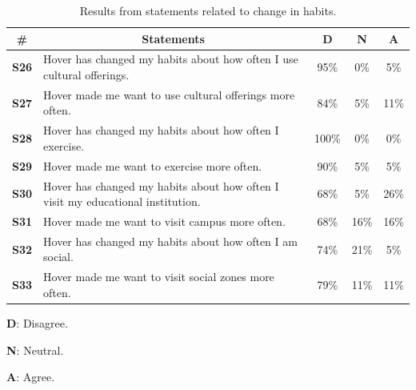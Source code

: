 \begin{table}[H]
    \begin{threeparttable}[t]
    \small
    \begin{tabularx}{\textwidth}{|c|X|c|c|c|}
        \hline
        \multicolumn{1}{|c|}{\textbf{\#}} &
        \multicolumn{1}{c|}{\textbf{Statements}}  & 
        \multicolumn{1}{c|}{\textbf{D}} & 
        \multicolumn{1}{c|}{\textbf{N}}  & 
        \multicolumn{1}{c|}{\textbf{A}} \\ \hline
        \textbf{S26} & Hover has changed my habits about how often I use cultural offerings. & 95\% & 0\% & 5\%  \\
        \textbf{S27} & Hover made me want to use cultural offerings more often. & 84\% & 5\% & 11\%  \\
        \textbf{S28} & Hover has changed my habits about how often I exercise. & 100\% & 0\% & 0\%  \\
        \textbf{S29} & Hover made me want to exercise more often. & 90\% & 5\% & 5\%  \\
        \textbf{S30} & Hover has changed my habits about how often I visit my educational institution. & 68\% & 5\% & 26\%  \\
        \textbf{S31} & Hover made me want to visit campus more often. & 68\% & 16\% & 16\%  \\
        \textbf{S32} & Hover has changed my habits about how often I am social. & 74\% & 21\% & 5\%  \\
        \textbf{S33} & Hover made me want to visit social zones more often. & 79\% & 11\% & 11\%  \\
        \hline
    \end{tabularx}
    \begin{tablenotes}
    \scriptsize
     \item[] \textbf{D}: Disagree.
     \item[] \textbf{N}: Neutral.
     \item[] \textbf{A}: Agree.
  \end{tablenotes}
  \end{threeparttable}
    \caption{Results from statements related to change in habits.}
    \label{tab:habits_statements}
    \vspace*{-\baselineskip}
\end{table}

